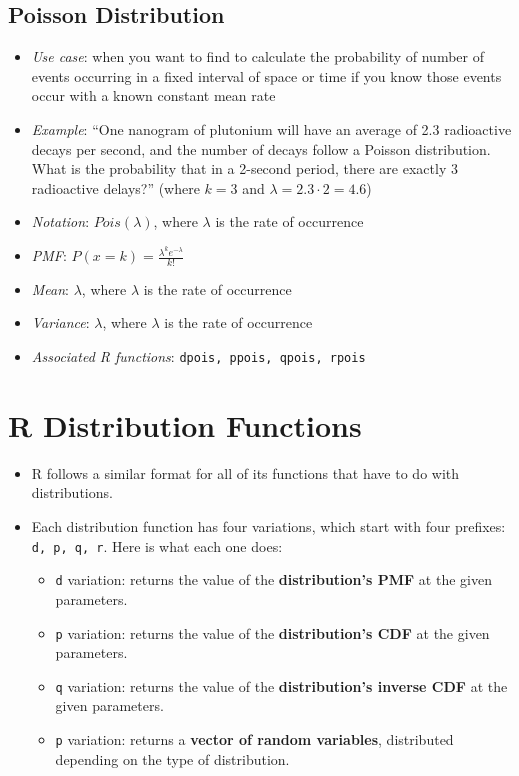 \documentclass[12pt]{article}
\begin{document}
\subsection{Poisson Distribution}
\begin{itemize}
	\item \textit{Use case}: when you want to find to
	      calculate the probability of number of events
	      occurring in a fixed interval of space or time if you
	      know those events occur with a known constant mean
	      rate
	\item \textit{Example}: ``One nanogram of plutonium will
	      have an average of 2.3 radioactive decays per
	      second, and the number of decays follow a Poisson
	      distribution. What is the probability that in a
	      2-second period, there are exactly 3 radioactive
	      delays?'' (where $k=3$ and $\lambda = 2.3 \cdot 2 = 4.6$)
	\item \textit{Notation}: $Pois(\lambda)$, where
	      $\lambda$ is the rate of occurrence
	\item \textit{PMF}: $P(x = k) = \frac{\lambda^k
			      e^{-\lambda}}{k!}$
	\item \textit{Mean}: $\lambda$, where $\lambda$ is the rate of occurrence
	\item \textit{Variance}: $\lambda$, where $\lambda$ is the rate of occurrence
	\item \textit{Associated R functions}: \verb|dpois, ppois, qpois, rpois|
\end{itemize}

\section{R Distribution Functions}

\begin{itemize}
	\item R follows a similar format for all of its functions that have to do with distributions.
	\item Each distribution function has four variations, which start with four prefixes: \verb|d, p, q, r|. Here is what each one does:
	      \begin{itemize}
		      \item \verb|d| variation: returns the value of the \textbf{distribution's PMF} at the given parameters.
		      \item \verb|p| variation: returns the value of the \textbf{distribution's CDF} at the given parameters.
		      \item \verb|q| variation: returns the value of the \textbf{distribution's inverse CDF} at the given parameters.
		      \item \verb|p| variation: returns a \textbf{vector of random variables}, distributed depending on the type of distribution.
	      \end{itemize}
\end{itemize}
\end{document}
